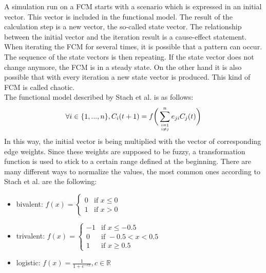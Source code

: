 \documentclass[conference]{IEEEtran}
\begin{document}
A simulation run on a FCM starts with a scenario which is expressed in an initial vector. This vector is included in the functional model. The result of the calculation step is a new vector, the so-called state vector. The relationship between the initial vector and the iteration result is a cause-effect statement.\\
When iterating the FCM for several times, it is possible that a pattern can occur. The sequence of the state vectors is then repeating. If the state vector does not change anymore, the FCM is in a steady state. On the other hand it is also possible that with every iteration a new state vector is produced. This kind of FCM is called chaotic.\\
The functional model described by Stach et al. \cite{stach2005} is as follows:\\
\begin{equation}
\forall i \in \{1,...,n\},C_{i}(t+1) = f  \bigg(\sum_{i=1 \atop i \neq j}^{n} e_{ji}C_{j}(t)\bigg)
\end{equation}
In this way, the initial vector is being multiplied with the vector of corresponding edge weights. Since these weights are supposed to be fuzzy, a transformation function is used to stick to a certain range defined at the beginning. There are many different ways to normalize the values, the most common ones according to Stach et al. \cite{stach2005} are the following:
\begin{itemize}
\item bivalent: \begin{math} f(x) = \begin{cases} 
0 & \text{if } x \leq 0\\ 
1 & \text{if } x > 0
\end{cases} \end{math}
\item trivalent: \begin{math} f(x) = \begin{cases}
-1 & \text{if } x \leq -0.5\\
0 & \text{if } -0.5 < x < 0.5\\
1 & \text{if } x \geq 0.5
\end{cases} \end{math}
\item logistic: \begin{math} f(x) = \frac{1}{1+e^{-cx}}, c \in \mathbb{R} \end{math}
\end{itemize}
\end{document}

